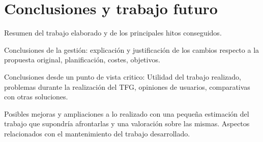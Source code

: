 \chapter{Conclusiones y trabajo futuro}
\newpage
Resumen del trabajo elaborado y de los principales hitos conseguidos.

Conclusiones de la gestión: explicación y justificación de 
los cambios respecto a la propuesta original, planificación, 
costes, objetivos.

Conclusiones desde un punto de vista critico: Utilidad del 
trabajo realizado, problemas durante la realización del TFG, 
opiniones de usuarios, comparativas con otras soluciones.

Posibles mejoras y ampliaciones a lo realizado con una 
pequeña estimación del trabajo que supondría afrontarlas 
y una valoración sobre las mismas. Aspectos relacionados con el
 mantenimiento del trabajo desarrollado.